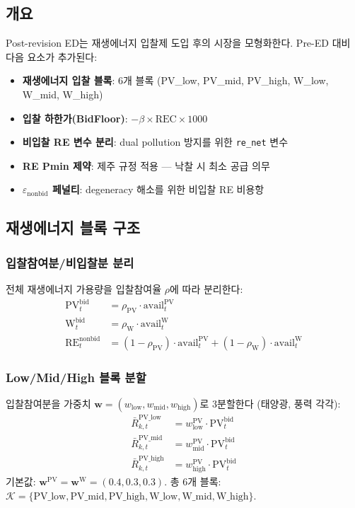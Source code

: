 \documentclass[11pt, a4paper]{article}
\begin{document}
\subsection{개요}

Post-revision ED는 재생에너지 입찰제 도입 후의 시장을 모형화한다.
Pre-ED 대비 다음 요소가 추가된다:
\begin{itemize}[noitemsep]
    \item \textbf{재생에너지 입찰 블록}: 6개 블록 (PV\_low, PV\_mid, PV\_high, W\_low, W\_mid, W\_high)
    \item \textbf{입찰 하한가(BidFloor)}: $-\beta \times \text{REC} \times 1000$
    \item \textbf{비입찰 RE 변수 분리}: dual pollution 방지를 위한 \texttt{re\_net} 변수
    \item \textbf{RE Pmin 제약}: 제주 규정 적용 --- 낙찰 시 최소 공급 의무
    \item \textbf{$\varepsilon_{\text{nonbid}}$ 페널티}: degeneracy 해소를 위한 비입찰 RE 비용항
\end{itemize}

\subsection{재생에너지 블록 구조}\label{sec:re_blocks}

\subsubsection{입찰참여분/비입찰분 분리}

전체 재생에너지 가용량을 입찰참여율 $\rho$에 따라 분리한다:
\begin{align}
    \text{PV}_t^{\text{bid}} &= \rho_{\text{PV}} \cdot \text{avail}_t^{\text{PV}} \label{eq:pv_bid} \\
    \text{W}_t^{\text{bid}} &= \rho_{\text{W}} \cdot \text{avail}_t^{\text{W}} \\
    \text{RE}_t^{\text{nonbid}} &= (1 - \rho_{\text{PV}}) \cdot \text{avail}_t^{\text{PV}}
        + (1 - \rho_{\text{W}}) \cdot \text{avail}_t^{\text{W}} \label{eq:re_nonbid}
\end{align}

\subsubsection{Low/Mid/High 블록 분할}

입찰참여분을 가중치 $\bm{w} = (w_{\text{low}}, w_{\text{mid}}, w_{\text{high}})$로 3분할한다
(태양광, 풍력 각각):
\begin{align}
    \bar{R}_{k,t}^{\text{PV\_low}}  &= w_{\text{low}}^{\text{PV}} \cdot \text{PV}_t^{\text{bid}} \\
    \bar{R}_{k,t}^{\text{PV\_mid}}  &= w_{\text{mid}}^{\text{PV}} \cdot \text{PV}_t^{\text{bid}} \\
    \bar{R}_{k,t}^{\text{PV\_high}} &= w_{\text{high}}^{\text{PV}} \cdot \text{PV}_t^{\text{bid}}
\end{align}
기본값: $\bm{w}^{\text{PV}} = \bm{w}^{\text{W}} = (0.4, 0.3, 0.3)$.
총 6개 블록: $\mathcal{K} = \{\text{PV\_low}, \text{PV\_mid}, \text{PV\_high}, \text{W\_low}, \text{W\_mid}, \text{W\_high}\}$.
\end{document}
